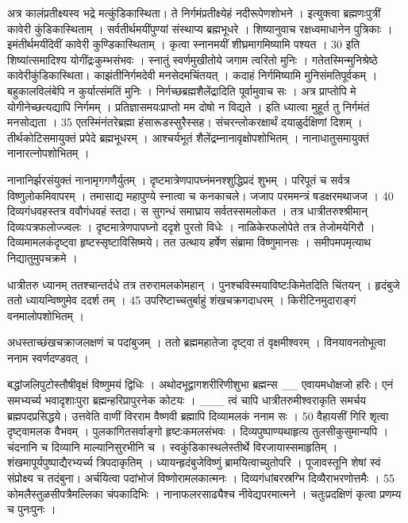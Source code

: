 अत्र कालंप्रतीक्ष्यस्व भद्रे मत्कुंडिकास्थिता।
 ते निर्गमंप्रतीक्ष्येहं नदीरूपेणशोभने ।
 इत्युक्त्वा ब्रह्मणःपुत्रीं कावेरी कुंडिकास्थिताम् ।
 सर्वतीर्थमयींपुण्यां संस्थाप्य ब्रह्मभूधरे ।
 शिष्यानुवाच रक्षध्वमाधानेन पुत्रिकाः ।
 इमंतीर्थमयींदेवीं कावेरी कुण्डिकास्थिताम् ।
 कृत्वा स्नानमयीं शीघ्रमागमिष्यामि पश्यत ।
 30 इति शिष्यांत्समादिश्य योगींद्रःकुम्भसंभवः ।
 स्नातुं स्वर्णमुखीतोये जगाम त्वरितो मुनिः ।
 गतेतस्मिन्मुनिश्रेष्ठे कावेरीकुंडिकास्थिता।
 काझंतीनिर्गमदेवी मनसेदमचिंतयत् ।
 कदाहं निर्गमिष्यामि मुनिसंमतिपूर्वकम् ।
 बहुकालविलंबेपि न कुर्यात्संमतिं मुनिः ।
 निर्गच्छब्रह्मशैलेंद्रादिति पूर्वामुवाच सः ।
 अत्र प्राप्तोपि मे योगीनेच्छत्यद्यापि निर्गमम् ।
 प्रतिज्ञासमयःप्राप्तो मम दोषो न विद्यते ।
 इति ध्यात्वा मुहूर्त तु निर्गमंतं मनसोद्यता ।
 35 एतस्मिंनंतरेब्रह्मा हंसारूडस्सुरैस्सह।
 संचरन्लोकरक्षार्थं दयाळुर्दक्षिणां दिशम् ।
 तीर्थकोटिसमायुक्तं प्रपेदे ब्रह्मभूधरम् ।
 आश्चर्यभूतं शैलेंद्रम्नानावृक्षोपशोभितम् ।
 नानाधातुसमायुक्तं नानारत्नोपशोभितम् ।
 
नानानिर्झरसंयुक्तं नानामृगगणैर्युतम् ।
 दृष्टमात्रेणपापघ्नंमनश्शुद्धिप्रदं शुभम् ।
 परिपूतं च सर्वत्र विष्णुलोकमिवापरम् ।
 तमासाद्य महापुण्ये स्नात्वा च कनकाचले।
 जजाप परममन्त्रं षडक्षरमथाजज ।
 40 दिव्यगंधवहस्तत्र ववौगंधवहं स्तदा।
 स सुगन्धं समाघ्राय सर्वतस्समलोकत ।
 तत्र धात्रीतरुश्श्रीमान् दिव्यःपत्रफलोज्ज्वलः ।
 दृष्टमात्रेणपापघ्नो ददृशे पुरतो विधेः ।
 नाळिकेरफलोपेते तत्र तेजोमयेगिरौ ।
 दिव्यमामलकंदृष्ट्वा हृष्टस्सृष्टाविसिष्मये।
 तत उत्थाय हर्षेण संब्रामा विष्णुमानसः ।
 समीपमपमृत्याथ निद्यातुमुपचक्रमे ।
 
धात्रीतरु ध्यानम् ततश्चान्तर्दधे तत्र तरुरामलकोमहान् ।
 पुनश्चविस्मयाविष्टःकिमेतदिति चिंतयन् ।
 हृदंबुजे ततो ध्यायन्विष्णुमेव ददर्श तम् ।
 45 उपरिष्टाच्चतुर्बाहुं शंखचक्रगदाधरम् ।
 किरीटिनमुदाराङ्गं वनमालोपशोभितम् ।
 
अधस्ताच्छंखचक्राजलक्षणं च पदांबुजम् ।
 ततो ब्रह्ममहातेजा दृष्ट्वा तं वृक्षमीश्वरम् ।
 विनयावनतोभूत्वा ननाम स्वर्णदण्डवत् ।
 
बद्धांजलिपुटोस्तौषीवृक्षं विष्णुमयं द्विधिः ।
 अथोदभूद्वागशरीरिणीशुभा ब्रह्मन्स
__ एवायमधोक्षजो हरिः।
 एनं समभ्यर्च्य भवादृशाःपुरा
ब्रह्मन्हरिप्रापुरनेक कोटयः ।
 ___ त्वं चापि धात्रीतरुमीश्वराकृति
समर्चय ब्रह्मपदप्रसिद्धये।
 उत्तवेति वाणीं विरराम वैष्णवी ब्रह्मापि
दिव्यामलकं ननाम सः ।
50 वैहायसीं गिरि शृत्वा दृष्ट्वामलक वैभवम् ।
 पुलकांगितसर्वाङ्गो हृष्टःकमलसंभवः ।
 दिव्यपुष्पाण्यथाहृत्य तुलसीकुसुमान्यपि ।
 चंदनानि च दिव्यानि माल्यानिसुरभीनि च ।
 स्वकुंडिकास्थलेस्तीर्थे विरजायास्समाहृतिम् ।
 शंखमापूर्यपुष्पाद्यैरभ्यर्च्य त्रिपदाकृतिम् ।
 ध्यायन्हृदंबुजेविष्णुं ब्रामयित्वाच्युतोपरि ।
 पूजावस्तूनि शेषां स्वं संप्रोक्ष्य च तदंबुना।
 अर्चयित्वा पदांभोजं विष्णोरामलकात्मनः ।
 दिव्यगंधांबरस्रग्भि दिव्यैराभरणोत्तमैः ।
 55 कोमलैस्तुळसीपत्रैमल्लिका चंपकादिभिः ।
 नानाफलरसाढ्यैश्च नीवेद्यपरमात्मने ।
 चतुःप्रदक्षिणं कृत्वा प्रणम्य च पुनःपुनः ।
 
